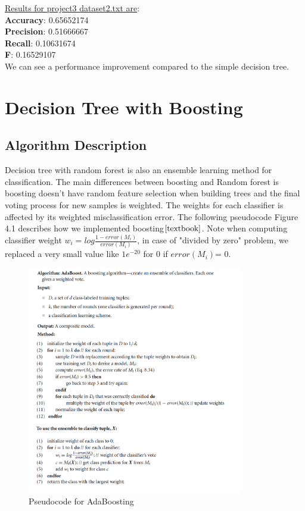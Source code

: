 \documentclass[paper=letter, fontsize=11pt]{article}
\numberwithin{equation}{section}		%
\numberwithin{figure}{section}			%
\numberwithin{table}{section}				%
\begin{document}
\noindent \underline{ Results for project3 dataset2.txt are}: \\ 
\textbf{Accuracy}: 0.65652174\\
\textbf{Precision}: 0.51666667\\
\textbf{Recall}: 0.10631674\\
\textbf{F}: 0.16529107\\

We can see a performance improvement compared to the simple decision tree.\\
\section{Decision Tree with Boosting}
\subsection{Algorithm Description}
Decision tree with random forest is also an ensemble learning method for classification.
The main differences between boosting and Random forest is boosting doesn't
have random feature selection when building trees and the final voting process for
new samples is weighted. The weights for each classifier is affected by its weighted
misclassification error. The following pseudocode Figure 4.1 describes how we implemented
boosting$\cite{textbook}$. Note when computing classifier weight $w_{i} = log\frac{1-error(M_{i})}{error(M_{i})}$, in case of "divided by zero" problem, we replaced a very small value like $1e^{-20}$ for 0 if  $error(M_{i})$= 0.
\begin{figure}[h]
  \centering
  \includegraphics[width=0.8\linewidth,height=10cm]{boosting.png}
  \caption{Pseudocode for AdaBoosting}
\end{figure}
\end{document}
